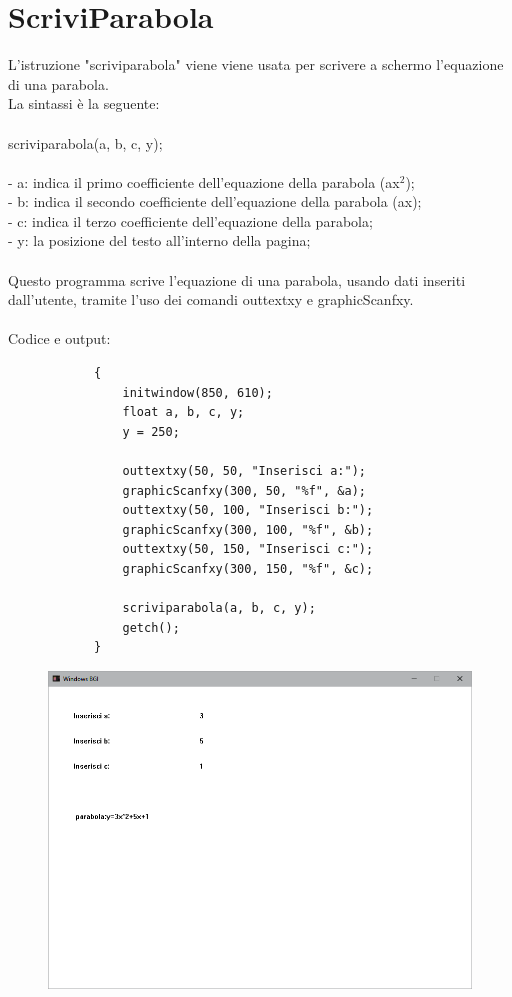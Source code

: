 \documentclass[12pt]{book}
\begin{document}
		\section{ScriviParabola}
		L'istruzione "scriviparabola" viene viene usata per scrivere a schermo l'equazione di una parabola.
		\\La sintassi è la seguente:
		\\
		\\
		\Large scriviparabola(a, b, c, y);
		\normalsize
		\\
		\\- a: indica il primo coefficiente dell'equazione della parabola (ax$^2$);
		\\- b: indica il secondo coefficiente dell'equazione della parabola (ax);
		\\- c: indica il terzo coefficiente dell'equazione della parabola; 
		\\- y: la posizione del testo all'interno della pagina;
		\\
		\\Questo programma scrive l'equazione di una parabola, usando dati inseriti dall'utente, tramite l'uso dei comandi outtextxy e graphicScanfxy.
		\\ \\Codice e output:
		\begin{lstlisting}
			{
				initwindow(850, 610);
				float a, b, c, y;
				y = 250;
				
				outtextxy(50, 50, "Inserisci a:");
				graphicScanfxy(300, 50, "%f", &a);
				outtextxy(50, 100, "Inserisci b:");
				graphicScanfxy(300, 100, "%f", &b);
				outtextxy(50, 150, "Inserisci c:");
				graphicScanfxy(300, 150, "%f", &c);
				
				scriviparabola(a, b, c, y);
				getch();
			}
		\end{lstlisting}
		

		\begin{figure}[h]
			\includegraphics[scale=0.5]{scriviparabolaterminale1}
		\end{figure}
		\clearpage
\end{document}
